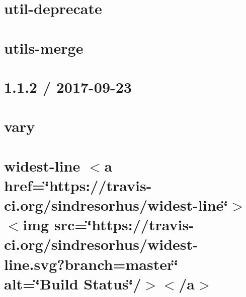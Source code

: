 \let\mypdfximage\pdfximage\def\pdfximage{\immediate\mypdfximage}\documentclass[twoside]{book}
\newcommand{\+}{\discretionary{\mbox{\scriptsize$\hookleftarrow$}}{}{}}
\begin{document}
\chapter{util-\/deprecate}
\label{md__c_1__git_hub__p_r_o_y_e_c_t_o-_i_i_i-_g_o_t_rest-api-node-mysql_node_modules_util-deprecate__r_e_a_d_m_e}

\chapter{utils-\/merge}
\label{md__c_1__git_hub__p_r_o_y_e_c_t_o-_i_i_i-_g_o_t_rest-api-node-mysql_node_modules_utils-merge__r_e_a_d_m_e}

\chapter{1.1.2 / 2017-\/09-\/23}
\label{md__c_1__git_hub__p_r_o_y_e_c_t_o-_i_i_i-_g_o_t_rest-api-node-mysql_node_modules_vary__h_i_s_t_o_r_y}

\chapter{vary}
\label{md__c_1__git_hub__p_r_o_y_e_c_t_o-_i_i_i-_g_o_t_rest-api-node-mysql_node_modules_vary__r_e_a_d_m_e}

\chapter{widest-\/line $<$a href=\char`\"{}https\+://travis-\/ci.\+org/sindresorhus/widest-\/line\char`\"{}$>$$<$img src=\char`\"{}https\+://travis-\/ci.\+org/sindresorhus/widest-\/line.\+svg?branch=master\char`\"{} alt=\char`\"{}\+Build Status\char`\"{}/$>$$<$/a$>$}
\label{md__c_1__git_hub__p_r_o_y_e_c_t_o-_i_i_i-_g_o_t_rest-api-node-mysql_node_modules_widest-line_readme}

\end{document}
